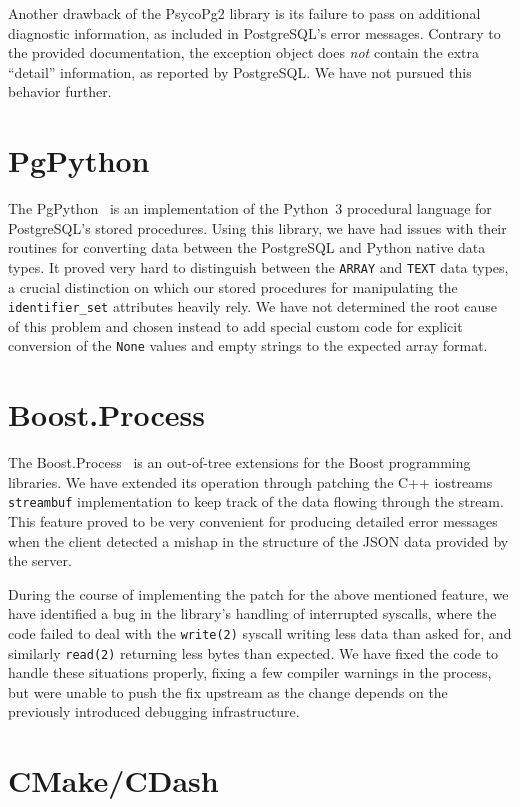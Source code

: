 \documentclass[deska]{subfiles}
\begin{document}
Another drawback of the PsycoPg2 library is its failure to pass on additional diagnostic information, as included in
PostgreSQL's error messages.  Contrary to the provided documentation, the exception object does {\em not} contain the
extra ``detail'' information, as reported by PostgreSQL.  We have not pursued this behavior further.

\section{PgPython}

The PgPython~\cite{pg-python} is an implementation of the Python~3 procedural language for PostgreSQL's stored
procedures.  Using this library, we have had issues with their routines for converting data between the PostgreSQL and
Python native data types.  It proved very hard to distinguish between the {\tt ARRAY} and {\tt TEXT} data types, a
crucial distinction on which our stored procedures for manipulating the {\tt identifier\_set} attributes heavily rely.
We have not determined the root cause of this problem and chosen instead to add special custom code for explicit
conversion of the {\tt None} values and empty strings to the expected array format.

\section{Boost.Process}

The Boost.Process~\cite{boost-process} is an out-of-tree extensions for the Boost programming libraries.  We have
extended its operation through patching the C++ iostreams {\tt streambuf} implementation to keep track of the data
flowing through the stream.  This feature proved to be very convenient for producing detailed error messages when the
client detected a mishap in the structure of the JSON data provided by the server.

During the course of implementing the patch for the above mentioned feature, we have identified a bug in the library's
handling of interrupted syscalls, where the code failed to deal with the {\tt write(2)} syscall writing less data than
asked for, and similarly {\tt read(2)} returning less bytes than expected.  We have fixed the code to handle these
situations properly, fixing a few compiler warnings in the process, but were unable to push the fix upstream as the
change depends on the previously introduced debugging infrastructure.

\section{CMake/CDash}
\end{document}
